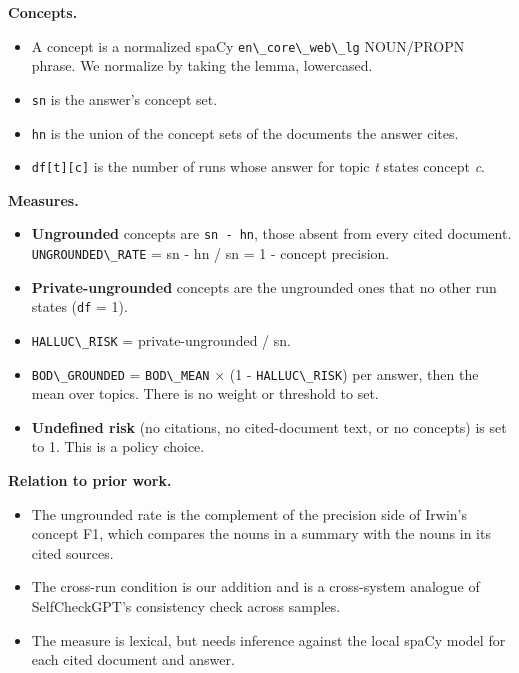\documentclass[
  10pt,
]{article}
\newcommand{\passthrough}[1]{#1}
\providecommand{\tightlist}{%
  \setlength{\itemsep}{0pt}\setlength{\parskip}{0pt}}
\begin{document}
\textbf{Concepts.}

\begin{itemize}
\tightlist
\item
  A concept is a normalized spaCy
  \passthrough{\lstinline!en\_core\_web\_lg!} NOUN/PROPN phrase. We
  normalize by taking the lemma, lowercased.
\item
  \passthrough{\lstinline!sn!} is the answer's concept set.
\item
  \passthrough{\lstinline!hn!} is the union of the concept sets of the
  documents the answer cites.
\item
  \passthrough{\lstinline!df[t][c]!} is the number of runs whose answer
  for topic \emph{t} states concept \emph{c}.
\end{itemize}

\textbf{Measures.}

\begin{itemize}
\tightlist
\item
  \textbf{Ungrounded} concepts are \passthrough{\lstinline!sn - hn!},
  those absent from every cited document.
  \passthrough{\lstinline!UNGROUNDED\_RATE!} = \textbar sn -
  hn\textbar{} / \textbar sn\textbar{} = 1 - concept precision.
\item
  \textbf{Private-ungrounded} concepts are the ungrounded ones that no
  other run states (\passthrough{\lstinline!df!} = 1).
\item
  \passthrough{\lstinline!HALLUC\_RISK!} =
  \textbar private-ungrounded\textbar{} / \textbar sn\textbar.
\item
  \passthrough{\lstinline!BOD\_GROUNDED!} =
  \passthrough{\lstinline!BOD\_MEAN!} \ensuremath{\times} (1 -
  \passthrough{\lstinline!HALLUC\_RISK!}) per answer, then the mean over
  topics. There is no weight or threshold to set.
\item
  \textbf{Undefined risk} (no citations, no cited-document text, or no
  concepts) is set to 1. This is a policy choice.
\end{itemize}

\textbf{Relation to prior work.}

\begin{itemize}
\tightlist
\item
  The ungrounded rate is the complement of the precision side of Irwin's
  concept F1, which compares the nouns in a summary with the nouns in
  its cited sources.
\item
  The cross-run condition is our addition and is a cross-system analogue
  of SelfCheckGPT's consistency check across samples.
\item
  The measure is lexical, but needs inference against the local spaCy
  model for each cited document and answer.
\end{itemize}
\end{document}
